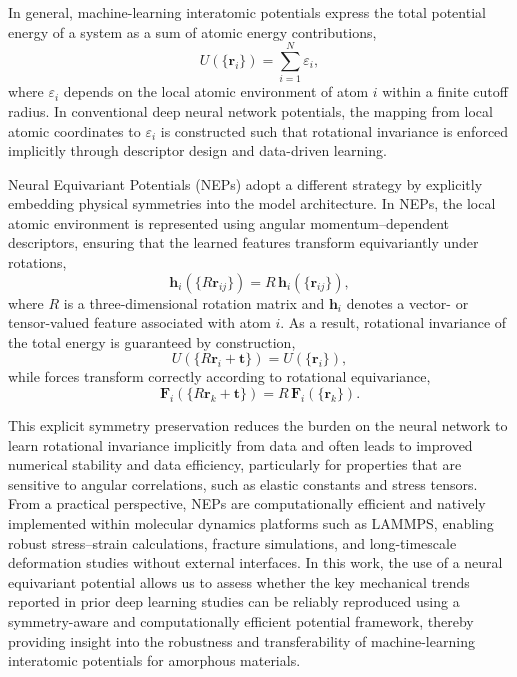 \documentclass[review, 12pt]{elsarticle}
\numberwithin{equation}{section}
\begin{document}
In general, machine-learning interatomic potentials express the total potential energy of a system as a sum of atomic energy contributions,
\begin{equation}
U(\{\mathbf{r}_i\}) = \sum_{i=1}^{N} \varepsilon_i,
\end{equation}
where $\varepsilon_i$ depends on the local atomic environment of atom $i$ within a finite cutoff radius. In conventional deep neural network potentials, the mapping from local atomic coordinates to $\varepsilon_i$ is constructed such that rotational invariance is enforced implicitly through descriptor design and data-driven learning.

Neural Equivariant Potentials (NEPs) adopt a different strategy by explicitly embedding physical symmetries into the model architecture. In NEPs, the local atomic environment is represented using angular momentum--dependent descriptors, ensuring that the learned features transform equivariantly under rotations,
\begin{equation}
\mathbf{h}_i(\{R\mathbf{r}_{ij}\}) = R\,\mathbf{h}_i(\{\mathbf{r}_{ij}\}),
\end{equation}
where $R$ is a three-dimensional rotation matrix and $\mathbf{h}_i$ denotes a vector- or tensor-valued feature associated with atom $i$. As a result, rotational invariance of the total energy is guaranteed by construction,
\begin{equation}
U(\{R\mathbf{r}_i + \mathbf{t}\}) = U(\{\mathbf{r}_i\}),
\end{equation}
while forces transform correctly according to rotational equivariance,
\begin{equation}
\mathbf{F}_i(\{R\mathbf{r}_k + \mathbf{t}\}) = R\,\mathbf{F}_i(\{\mathbf{r}_k\}).
\end{equation}

This explicit symmetry preservation reduces the burden on the neural network to learn rotational invariance implicitly from data and often leads to improved numerical stability and data efficiency, particularly for properties that are sensitive to angular correlations, such as elastic constants and stress tensors. From a practical perspective, NEPs are computationally efficient and natively implemented within molecular dynamics platforms such as LAMMPS, enabling robust stress--strain calculations, fracture simulations, and long-timescale deformation studies without external interfaces. In this work, the use of a neural equivariant potential allows us to assess whether the key mechanical trends reported in prior deep learning studies can be reliably reproduced using a symmetry-aware and computationally efficient potential framework, thereby providing insight into the robustness and transferability of machine-learning interatomic potentials for amorphous materials.
\end{document}
